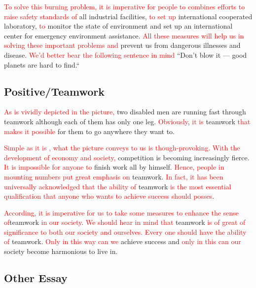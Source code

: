 \documentclass{article}
\begin{document}
\par \textcolor{red}{To solve this burning problem, it is imperative for people to
  combines efforts to raise safety standards of} all industrial facilities,
\textcolor{red}{to set up} international cooperated laboratory, \textcolor{red}{to}
monitor the state of environment and set up an international center for emergency
environment assistance. \textcolor{red}{All these measures will help us in solving these
  important problems and} prevent us from dangerous illnesses and
disease. \textcolor{red}{We'd better bear the following sentence in mind} ``Don't blow it
--- good planets are hard to find.``

\subsection{Positive/Teamwork}
\label{sec:positive}

\hspace{0.5cm} \textcolor{red}{As is vividly depicted in the picture,} two disabled men
are running fast through teamwork although each of them has only one
leg. \textcolor{red}{Obviously}, \textcolor{red}{it is }teamwork \textcolor{red}{that
  makes it possible }for them to go anywhere they want to.

\par \textcolor{red}{Simple as it is , what the picture conveys to us is
  though-provoking. } \textcolor{red}{With the development of economy and society,
}competition is becoming increasingly fierce. \textcolor{red}{It is impossible for anyone
  to }finish work all by himself. \textcolor{red}{Hence, people in mounting numbers put great
  emphasis on }teamwork. \textcolor{red}{In fact, it has been universally acknowledged that
  the ability of }teamwork \textcolor{red}{is the most essential qualification that anyone
  who wants to achieve success should posses}.

\par \textcolor{red}{According, it is imperative for us to take some measures to enhance
  the sense of}teamwork \textcolor{red}{in our society}. \textcolor{red}{We should hear in mind that
}teamwork \textcolor{red}{is of great of significance to both our society and ourselves.}
\textcolor{red}{Every one should have the ability of }teamwork. \textcolor{red}{Only in this
  way can we }achieve success and \textcolor{red}{only in this can our} society become harmonious to live in.

\subsection{Other Essay}
\label{sec:other-essay}
\end{document}
